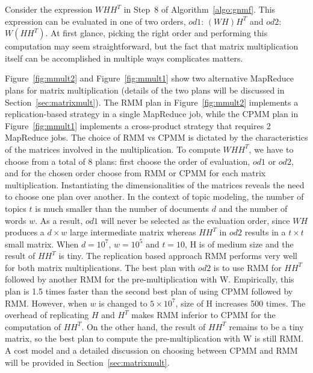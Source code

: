 
Consider the expression $WHH^T$ in Step~8 of
Algorithm~\ref{algo:gnmf}. This expression can be
evaluated in one of two orders, $od1$: $(WH)H^T$ and $od2$: $W(HH^T)$. 
At first glance, picking the right order and performing this computation 
may seem straightforward, but the fact that matrix multiplication itself can be accomplished in 
multiple ways complicates matters.

Figure~\ref{fig:mmult2} and Figure~\ref{fig:mmult1} show two alternative MapReduce plans for matrix
multiplication (details of the two plans will be discussed in Section~\ref{sec:matrixmult}). The RMM
plan in Figure~\ref{fig:mmult2} implements a replication-based strategy in a single MapReduce job,
while the CPMM plan in Figure~\ref{fig:mmult1} implements a cross-product strategy that requires 2
MapReduce jobs. The choice of RMM vs CPMM is dictated by the characteristics of the matrices
involved in the multiplication. To compute $WHH^T$, we have to choose from a total of 8 plans: first
choose the order of evaluation, $od1$ or $od2$, and for the chosen order choose from RMM or CPMM for
each matrix multiplication. Instantiating the dimensionalities of the matrices reveals the need to
choose one plan over another. In the context of topic modeling, the number of topics $t$ is much
smaller than the number of documents $d$ and the number of words $w$. As a result, $od1$ will never
be selected as the evaluation order, since $WH$ produces a $d\times w$ large intermediate matrix
whereas $HH^T$ in $od2$ results in a $t\times t$ small matrix. When $d=10^7$, $w=10^5$ and $t=10$, H
is of medium size and the result of $HH^T$ is tiny. The replication based approach RMM performs very
well for both matrix multiplications. The best plan with $od2$ is to use RMM for $HH^T$ followed by
another RMM for the pre-multiplication with W.  Empirically, this plan is 1.5 times faster than the
second best plan of using CPMM followed by RMM. However, when $w$ is changed to $5\times 10^7$, size
of H increases 500 times. The overhead of replicating $H$ and $H^T$ makes RMM inferior to CPMM for
the computation of $HH^T$. On the other hand, the result of $HH^T$ remains to be a tiny matrix, so
the best plan to compute the pre-multiplication with W is still RMM. A cost model and a detailed
discussion on choosing between CPMM and RMM will be provided in Section~\ref{sec:matrixmult}.

